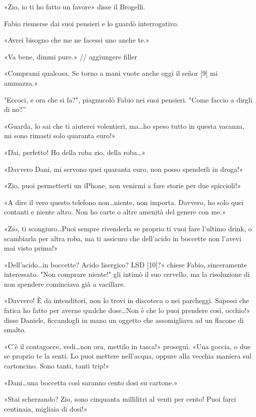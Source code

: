 «Zio, io ti ho fatto un favore» disse il Brogelli.

Fabio riemerse dai suoi pensieri e lo guardò interrogativo.

«Avrei bisogno che me ne facessi uno anche te.»

«Va bene, dimmi pure.» // aggiungere filler

«Comprami qualcosa. Se torno a mani vuote anche oggi il señor [9] mi ammazza.»

"Eccoci, e ora che si fa?", piagnucolò Fabio nei suoi pensieri. "Come faccio a dirgli di no?''

«Guarda, lo sai che ti aiuterei volentieri, ma\ldots ho speso tutto in questa vacanza, mi sono rimasti solo quaranta euro!»

«Dai, perfetto! Ho della roba zio, della roba\ldots»

«Davvero Dani, mi servono quei quaranta euro, non posso spenderli in droga!»

«Zio, puoi permetterti un iPhone, non venirmi a fare storie per due spiccioli!»

«A dire il vero questo telefono non\ldots niente, non importa. Davvero, ho solo quei contanti e niente altro. Non ho carte o altre amenità del genere con me.»

«Zio, ti scongiuro\ldots Puoi sempre rivenderla se proprio ti vuoi fare l'ultimo drink, o scambiarla per altra roba, ma ti assicuro che dell'acido in boccette non l'avevi mai visto prima!»

«Dell'acido\ldots in boccette? Acido lisergico? LSD [10]?» chiese Fabio, sinceramente interessato. "Non comprare niente!" gli intimò il suo cervello, ma la risoluzione di non spendere cominciava già a vacillare.

«Davvero! È da intenditori, non lo trovi in discoteca o nei parcheggi. Sapessi che fatica ho fatto per averne qualche dose\ldots Non è che lo puoi prendere così, occhio!» disse Daniele, ficcandogli in mano un oggetto che assomigliava ad un flacone di smalto.

«C'è il contagocce, vedi\ldots non ora, mettilo in tasca!» proseguì. «Una goccia, o due se proprio te la senti. Lo puoi mettere nell'acqua, oppure alla vecchia maniera sul cartoncino. Sono tanti, tanti trip!»

«Dani\ldots una boccetta così saranno cento dosi su cartone.»

«Stai scherzando? Zio, sono cinquanta millilitri al venti per cento! Puoi farci centinaia, migliaia di dosi!»

